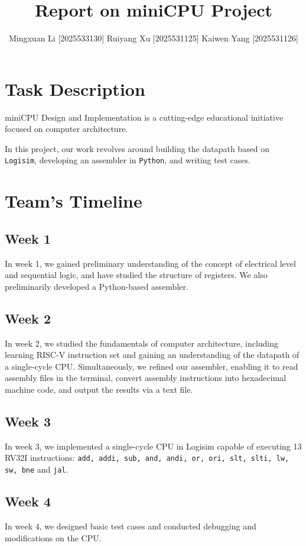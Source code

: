\documentclass[11pt]{article}
\title{Report on miniCPU Project}
\author{Mingxuan Li [2025533130] \quad Ruiyang Xu [2025531125] \quad Kaiwen Yang [2025531126]}
\date{}
\begin{document}
\maketitle

\section{Task Description}
miniCPU Design and Implementation is a cutting-edge educational initiative focused on computer architecture.

In this project, our work revolves around building the datapath based on \texttt{Logisim}, developing an assembler in \texttt{Python}, and writing test cases.

\section{Team's Timeline}

\subsection{Week 1}
In week 1, we gained preliminary understanding of the concept of electrical level and sequential logic, and have studied the structure of registers. We also preliminarily developed a Python-based assembler.

\subsection{Week 2}
In week 2, we studied the fundamentals of computer architecture, including learning RISC-V instruction set and gaining an understanding of the datapath of a single-cycle CPU. Simultaneously, we refined our assembler, enabling it to read assembly files in the terminal, convert assembly instructions into hexadecimal machine code, and output the results via a text file.

\subsection{Week 3}
In week 3, we implemented a single-cycle CPU in Logisim capable of executing 13 RV32I instructions: \texttt{add, addi, sub, and, andi, or, ori, slt, slti, lw, sw, bne} and \texttt{jal}.

\subsection{Week 4}
In week 4, we designed basic test cases and conducted debugging and modifications on the CPU.
\end{document}

